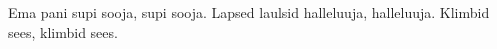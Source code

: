 Ema pani supi sooja, supi sooja.
Lapsed laulsid halleluuja, halleluuja.
Klimbid sees, klimbid sees.
